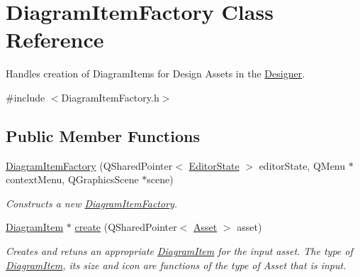 \hypertarget{class_diagram_item_factory}{\section{Diagram\-Item\-Factory Class Reference}
\label{class_diagram_item_factory}
}


Handles creation of Diagram\-Items for Design Assets in the \hyperlink{class_designer}{Designer}.  




{\ttfamily \#include $<$Diagram\-Item\-Factory.\-h$>$}

\subsection*{Public Member Functions}
\begin{DoxyCompactItemize}
\item 
\hyperlink{class_diagram_item_factory_a44687df18c7904a9cc5f2c69ebd4fb12}{Diagram\-Item\-Factory} (Q\-Shared\-Pointer$<$ \hyperlink{class_editor_state}{Editor\-State} $>$ editor\-State, Q\-Menu $\ast$context\-Menu, Q\-Graphics\-Scene $\ast$scene)
\begin{DoxyCompactList}\small\item\em Constructs a new \hyperlink{class_diagram_item_factory}{Diagram\-Item\-Factory}. \end{DoxyCompactList}\item 
\hypertarget{class_diagram_item_factory_aa6a698c7bfd5e8099d6aa4f683d66324}{\hyperlink{class_diagram_item}{Diagram\-Item} $\ast$ \hyperlink{class_diagram_item_factory_aa6a698c7bfd5e8099d6aa4f683d66324}{create} (Q\-Shared\-Pointer$<$ \hyperlink{class_picto_1_1_asset}{Asset} $>$ asset)}\label{class_diagram_item_factory_aa6a698c7bfd5e8099d6aa4f683d66324}

\begin{DoxyCompactList}\small\item\em Creates and retuns an appropriate \hyperlink{class_diagram_item}{Diagram\-Item} for the input asset. The type of \hyperlink{class_diagram_item}{Diagram\-Item}, its size and icon are functions of the type of Asset that is input. \end{DoxyCompactList}\end{DoxyCompactItemize}
